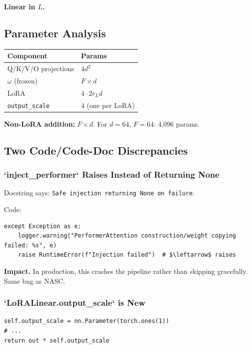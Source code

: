 \textbf{Linear in $L$.}

\subsection{Parameter Analysis}

\begin{table}[H]
\centering
\small
\begin{tabular}{ll}
\toprule
\textbf{Component} & \textbf{Params} \\
\midrule
Q/K/V/O projections & $4 d^2$ \\
$\omega$ (frozen) & $F \times d$ \\
LoRA & $4 \cdot 2 r_L d$ \\
\texttt{output\_scale} & $4$ (one per LoRA) \\
\bottomrule
\end{tabular}
\end{table}

\textbf{Non-LoRA addition:} $F \times d$. For $d = 64$, $F = 64$: 4,096 params.

\subsection{Two Code/Code-Doc Discrepancies}

\subsubsection{`inject\_performer` Raises Instead of Returning None}

Docstring says: \texttt{Safe injection returning None on failure}.

Code:

\begin{lstlisting}
except Exception as e:
    logger.warning("PerformerAttention construction/weight copying failed: %s", e)
    raise RuntimeError(f"Injection failed")  # $\leftarrow$ raises
\end{lstlisting}

\textbf{Impact.} In production, this crashes the pipeline rather than skipping 
gracefully. Same bug as NASC.

\subsubsection{`LoRALinear.output\_scale` is New}

\begin{lstlisting}
self.output_scale = nn.Parameter(torch.ones(1))
# ...
return out * self.output_scale
\end{lstlisting}

